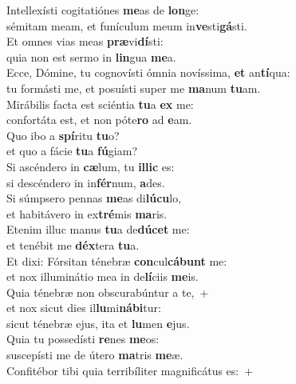 \evenverse Intellexísti cogitatiónes \textbf{me}as de \textbf{lon}ge:~\*\\
\evenverse sémitam meam, et funículum meum in\textbf{ve}sti\textbf{gá}sti.\\
\oddverse Et omnes vias meas \textbf{præ}vi\textbf{dí}sti:~\*\\
\oddverse quia non est sermo in \textbf{lin}gua \textbf{me}a.\\
\evenverse Ecce, Dómine, tu cognovísti ómnia novíssima, \textbf{et} an\textbf{tí}qua:~\*\\
\evenverse tu formásti me, et posuísti super me \textbf{ma}num \textbf{tu}am.\\
\oddverse Mirábilis facta est sciéntia \textbf{tu}a \textbf{ex} me:~\*\\
\oddverse confortáta est, et non póte\textbf{ro} ad \textbf{e}am.\\
\evenverse Quo ibo a \textbf{spí}ritu \textbf{tu}o?~\*\\
\evenverse et quo a fácie \textbf{tu}a \textbf{fú}giam?\\
\oddverse Si ascéndero in \textbf{cæ}lum, tu \textbf{il}\textbf{lic} es:~\*\\
\oddverse si descéndero in in\textbf{fér}num, \textbf{a}des.\\
\evenverse Si súmpsero pennas \textbf{me}as di\textbf{lú}\textbf{cu}lo,~\*\\
\evenverse et habitávero in ex\textbf{tré}mis \textbf{ma}ris.\\
\oddverse Etenim illuc manus \textbf{tu}a de\textbf{dú}\textbf{cet} me:~\*\\
\oddverse et tenébit me \textbf{déx}tera \textbf{tu}a.\\
\evenverse Et dixi: Fórsitan ténebræ \textbf{con}cul\textbf{cá}\textbf{bunt} me:~\*\\
\evenverse et nox illuminátio mea in de\textbf{lí}ciis \textbf{me}is.\\
\oddverse Quia ténebræ non obscurabúntur a te,~+\\
\oddverse  et nox sicut dies il\textbf{lu}mi\textbf{ná}\textbf{bi}tur:~\*\\
\oddverse sicut ténebræ ejus, ita et \textbf{lu}men \textbf{e}jus.\\
\evenverse Quia tu possedísti \textbf{re}nes \textbf{me}os:~\*\\
\evenverse suscepísti me de útero \textbf{ma}tris \textbf{me}æ.\\
\oddverse Confitébor tibi quia terribíliter magnificátus es:~+\\
